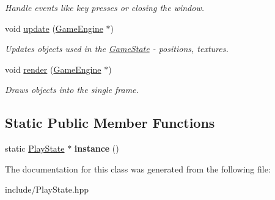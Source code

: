 \begin{DoxyCompactItemize}
\begin{DoxyCompactList}\small\item\em Handle events like key presses or closing the window. \end{DoxyCompactList}\item 
\mbox{\label{class_play_state_ad784c6b3e75c68505df30d51ebce4523}} 
void \mbox{\hyperlink{class_play_state_ad784c6b3e75c68505df30d51ebce4523}{update}} (\mbox{\hyperlink{class_game_engine}{Game\+Engine}} $\ast$)
\begin{DoxyCompactList}\small\item\em Updates objects used in the \mbox{\hyperlink{class_game_state}{Game\+State}} -\/ positions, textures. \end{DoxyCompactList}\item 
\mbox{\label{class_play_state_a186b8cb25c420e2ce54002bcb08d8bee}} 
void \mbox{\hyperlink{class_play_state_a186b8cb25c420e2ce54002bcb08d8bee}{render}} (\mbox{\hyperlink{class_game_engine}{Game\+Engine}} $\ast$)
\begin{DoxyCompactList}\small\item\em Draws objects into the single frame. \end{DoxyCompactList}\end{DoxyCompactItemize}
\subsection*{Static Public Member Functions}
\begin{DoxyCompactItemize}
\item 
\mbox{\label{class_play_state_a6a46a82e229d66dae0c68244faa7ade3}} 
static \mbox{\hyperlink{class_play_state}{Play\+State}} $\ast$ {\bfseries instance} ()
\end{DoxyCompactItemize}


The documentation for this class was generated from the following file\+:\begin{DoxyCompactItemize}
\item 
include/Play\+State.\+hpp\end{DoxyCompactItemize}
